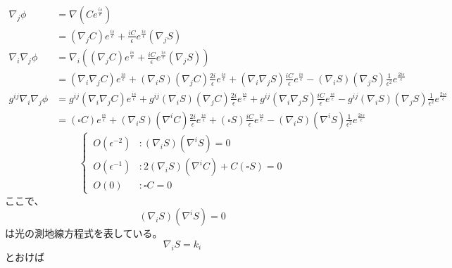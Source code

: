 \documentclass[dvipdfmx]{report} %
\begin{document}
\begin{equation*}
\begin{split}
	\nabla_j \phi &= \nabla \left( Ce^{\frac{is}{\epsilon}} \right)\\
	&= \left( \nabla_j C \right) e^{\frac{is}{\epsilon}} + \frac{iC}{\epsilon} e^{\frac{is}{\epsilon}} \left( \nabla_j S \right)\\
	\nabla_i \nabla_j \phi &= \nabla_i \left(  \left( \nabla_j C \right) e^{\frac{is}{\epsilon}} + \frac{iC}{\epsilon} e^{\frac{is}{\epsilon}} \left( \nabla_j S \right) \right)\\
	&= \left( \nabla_i \nabla_j C \right) e^{\frac{is}{\epsilon}} + \left( \nabla_i S \right) \left( \nabla_j C \right) \frac{2i}{\epsilon} e^{\frac{is}{\epsilon}} + \left( \nabla_i \nabla_j S \right) \frac{iC}{\epsilon} e^{\frac{is}{\epsilon}} -  \left( \nabla_i S \right) \left( \nabla_j S \right) \frac{1}{\epsilon^2} e^{\frac{2is}{\epsilon}}\\
	g^{ij} \nabla_i \nabla_j \phi &= g^{ij}\left( \nabla_i \nabla_j C \right) e^{\frac{is}{\epsilon}} + g^{ij}\left( \nabla_i S \right) \left( \nabla_j C \right) \frac{2i}{\epsilon} e^{\frac{is}{\epsilon}} + g^{ij}\left( \nabla_i \nabla_j S \right) \frac{iC}{\epsilon} e^{\frac{is}{\epsilon}} -  g^{ij}\left( \nabla_i S \right) \left( \nabla_j S \right) \frac{1}{\epsilon^2} e^{\frac{2is}{\epsilon}}\\
	&= \left( \square C \right) e^{\frac{is}{\epsilon}} + \left( \nabla_i S \right) \left( \nabla^i C \right) \frac{2i}{\epsilon} e^{\frac{is}{\epsilon}} + \left( \square S \right) \frac{iC}{\epsilon} e^{\frac{is}{\epsilon}} -  \left( \nabla_i S \right) \left( \nabla^i S \right) \frac{1}{\epsilon^2} e^{\frac{2is}{\epsilon}}
\end{split}
\end{equation*}
\begin{equation}
\left\{ \,
\begin{aligned}
	O(\epsilon^{-2}) &: \left( \nabla_i S \right) \left( \nabla^i S \right) = 0\\
	O(\epsilon^{-1}) &: 2 \left( \nabla_i S \right) \left( \nabla^i C \right) + C \left( \square S \right) = 0\\
	O(0) &: \square C = 0
\end{aligned}
\right.
\end{equation}
ここで、\[ \left( \nabla_i S \right) \left( \nabla^i S \right) = 0 \]は光の測地線方程式を表している。
\[ \nabla_i S  =  k_i \]とおけば
\end{document}
